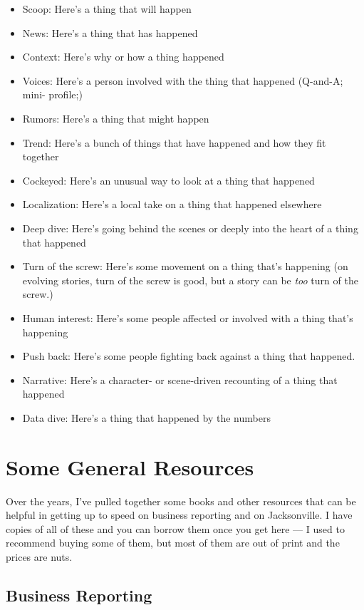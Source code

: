 \documentclass[
  11pt,
  american,
  letterpaperpaper,
  extrafontsizes,onecolumn,openright
  ]{memoir}
\providecommand{\tightlist}{%
  \setlength{\itemsep}{0pt}\setlength{\parskip}{0pt}}
\begin{document}
\begin{itemize}
\tightlist
\item
  Scoop: Here's a thing that will happen
\item
  News: Here's a thing that has happened
\item
  Context: Here's why or how a thing happened
\item
  Voices: Here's a person involved with the thing that happened (Q-and-A; mini- profile;)
\item
  Rumors: Here's a thing that might happen
\item
  Trend: Here's a bunch of things that have happened and how they fit together
\item
  Cockeyed: Here's an unusual way to look at a thing that happened
\item
  Localization: Here's a local take on a thing that happened elsewhere
\item
  Deep dive: Here's going behind the scenes or deeply into the heart of a thing that happened
\item
  Turn of the screw: Here's some movement on a thing that's happening (on evolving stories, turn of the screw is good, but a story can be \emph{too} turn of the screw.)
\item
  Human interest: Here's some people affected or involved with a thing that's happening
\item
  Push back: Here's some people fighting back against a thing that happened.
\item
  Narrative: Here's a character- or scene-driven recounting of a thing that happened
\item
  Data dive: Here's a thing that happened by the numbers
\end{itemize}

\hypertarget{some-general-resources}{%
\chapter{Some General Resources}\label{some-general-resources}}

Over the years, I've pulled together some books and other resources that can be helpful in getting up to speed on business reporting and on Jacksonville. I have copies of all of these and you can borrow them once you get here --- I used to recommend buying some of them, but most of them are out of print and the prices are nuts.

\hypertarget{business-reporting}{%
\section*{Business Reporting}\label{business-reporting}}
\end{document}

